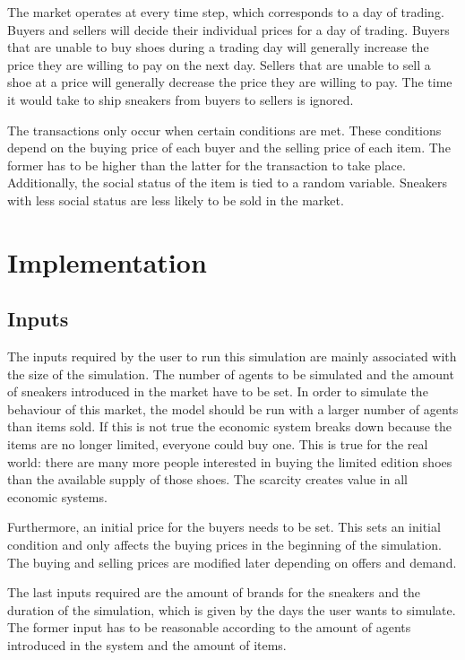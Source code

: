 \documentclass[12pt]{article}
\begin{document}
The market operates at every time step, which corresponds to a day of trading. Buyers and sellers will decide their individual prices for a day of trading. Buyers that are unable to buy shoes during a trading day will generally increase the price they are willing to pay on the next day. Sellers that are unable to sell a shoe at a price will generally decrease the price they are willing to pay. The time it would take to ship sneakers from buyers to sellers is ignored. 

The transactions only occur when certain conditions are met. These conditions depend on the buying price of each buyer and the selling price of each item. The former has to be higher than the latter for the transaction to take place. Additionally, the social status of the item is tied to a random variable. Sneakers with less social status are less likely to be sold in the market. 

\newpage
\section{Implementation}
\subsection{Inputs}

The inputs required by the user to run this simulation are mainly associated with the size of the simulation. The number of agents to be simulated and the amount of sneakers introduced in the market have to be set. In order to simulate the behaviour of this market, the model should be run with a larger number of agents than items sold. If this is not true the economic system breaks down because the items are no longer limited, everyone could buy one. This is true for the real world: there are many more people interested in buying the limited edition shoes than the available supply of those shoes. The scarcity creates value in all economic systems.

Furthermore, an initial price for the buyers needs to be set. This sets an initial condition and only affects the buying prices in the beginning of the simulation. The buying and selling prices are modified later depending on offers and demand.

The last inputs required are the amount of brands for the sneakers and the duration of the simulation, which is given by the days the user wants to simulate. The former input has to be reasonable according to the amount of agents introduced in the system and the amount of items. 
\end{document}
